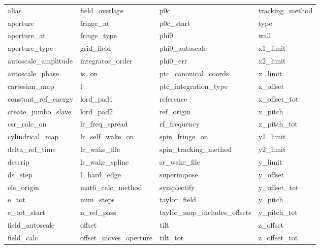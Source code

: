  \begin{tabular}{llll} \toprule
alias                       & field_overlaps              & p0c                         & tracking_method             \\
aperture                    & fringe_at                   & p0c_start                   & type                        \\
aperture_at                 & fringe_type                 & phi0                        & wall                        \\
aperture_type               & grid_field                  & phi0_autoscale              & x1_limit                    \\
autoscale_amplitude         & integrator_order            & phi0_err                    & x2_limit                    \\
autoscale_phase             & is_on                       & ptc_canonical_coords        & x_limit                     \\
cartesian_map               & l                           & ptc_integration_type        & x_offset                    \\
constant_ref_energy         & lord_pad1                   & reference                   & x_offset_tot                \\
create_jumbo_slave          & lord_pad2                   & ref_origin                  & x_pitch                     \\
csr_calc_on                 & lr_freq_spread              & rf_frequency                & x_pitch_tot                 \\
cylindrical_map             & lr_self_wake_on             & spin_fringe_on              & y1_limit                    \\
delta_ref_time              & lr_wake_file                & spin_tracking_method        & y2_limit                    \\
descrip                     & lr_wake_spline              & sr_wake_file                & y_limit                     \\
ds_step                     & l_hard_edge                 & superimpose                 & y_offset                    \\
ele_origin                  & mat6_calc_method            & symplectify                 & y_offset_tot                \\
e_tot                       & num_steps                   & taylor_field                & y_pitch                     \\
e_tot_start                 & n_ref_pass                  & taylor_map_includes_offsets & y_pitch_tot                 \\
field_autoscale             & offset                      & tilt                        & z_offset                    \\
field_calc                  & offset_moves_aperture       & tilt_tot                    & z_offset_tot                \\
 \bottomrule
 \end{tabular}
 \vfill
 
